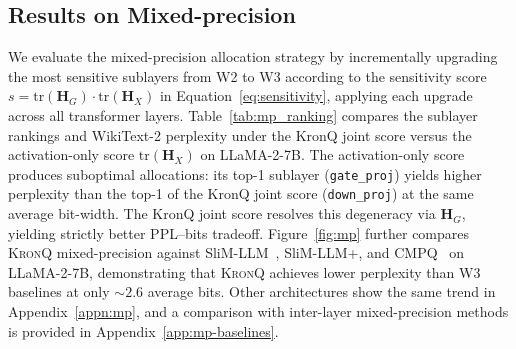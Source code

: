 \documentclass{article} %
\newcommand{\KronQ}{\textsc{KronQ}}
\begin{document}
\vspace{-2mm}
\subsection{Results on Mixed-precision}
\label{sec:exp:mp}
\vspace{-1mm}
We evaluate the mixed-precision allocation strategy by incrementally upgrading the most sensitive sublayers from W2 to W3 according to the sensitivity score $s = \mathrm{tr}(\mathbf{H}_G) \cdot \mathrm{tr}(\mathbf{H}_X)$ in Equation~\eqref{eq:sensitivity}, applying each upgrade across all transformer layers. Table~\ref{tab:mp_ranking} compares the sublayer rankings and WikiText-2 perplexity under the KronQ joint score versus the activation-only score $\mathrm{tr}(\mathbf{H}_X)$ on LLaMA-2-7B. The activation-only score produces suboptimal allocations: its top-1 sublayer (\texttt{gate\_proj}) yields higher perplexity than the top-1 of the KronQ joint score (\texttt{down\_proj}) at the same average bit-width. The KronQ joint score resolves this degeneracy via $\mathbf{H}_G$, yielding strictly better PPL--bits tradeoff. Figure~\ref{fig:mp} further compares \KronQ{} mixed-precision against SliM-LLM~\citep{huang2024slim}, SliM-LLM+, and CMPQ~\citep{chen2024channel} on LLaMA-2-7B, demonstrating that \KronQ{} achieves lower perplexity than W3 baselines at only ${\sim}2.6$ average bits. Other architectures show the same trend in Appendix~\ref{appn:mp}, and a comparison with inter-layer mixed-precision methods is provided in Appendix~\ref{app:mp-baselines}.

\end{document}
